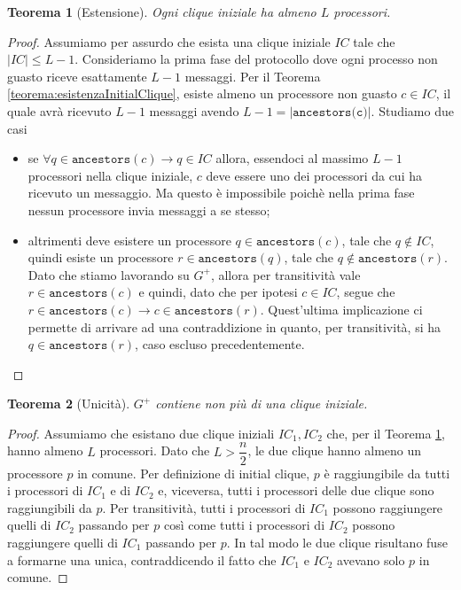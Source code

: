 \documentclass{article}
\newtheorem{teorema}{Teorema}
\begin{document}
\begin{teorema}[Estensione]
\label{teorema:estensioneInitialClique}
  Ogni clique iniziale ha almeno $L$ processori.
\end{teorema}
\begin{proof}
  Assumiamo per assurdo che esista una clique iniziale $IC$ tale che
  $|IC|\leq L-1$.  Consideriamo la prima fase del protocollo dove ogni
  processo non guasto riceve esattamente $L-1$ messaggi. Per il
  Teorema \ref{teorema:esistenzaInitialClique}, esiste almeno un
  processore non guasto $c \in IC$, il quale avrà ricevuto $L-1$
  messaggi avendo $L-1 = |\texttt{ancestors(c)}|$. Studiamo due casi
  \begin{itemize}
  \item se $\forall q \in \texttt{ancestors}(c) \rightarrow q \in IC$
    allora, essendoci al massimo $L-1$ processori nella clique
    iniziale, $c$ deve essere uno dei processori da cui ha ricevuto un
    messaggio. Ma questo è impossibile poichè nella prima fase nessun
    processore invia messaggi a se stesso;
  \item altrimenti deve esistere un processore $q \in
    \texttt{ancestors}(c)$, tale che $q \not \in IC$, quindi esiste un
    processore $r \in \texttt{ancestors} (q)$, tale che $q \not \in
    \texttt{ancestors} (r)$. Dato che stiamo lavorando su $G^+$,
    allora per transitivit\`a vale $r \in \texttt{ancestors} (c)$ e
    quindi, dato che per ipotesi $c \in IC$, segue che $r \in
    \texttt{ancestors} (c) \rightarrow c \in \texttt{ancestors}
    (r)$. Quest'ultima implicazione ci permette di arrivare ad una
    contraddizione in quanto, per transitivit\`a, si ha $q \in
    \texttt{ancestors}(r)$, caso escluso precedentemente.
  \end{itemize}
\end{proof}


\begin{teorema}[Unicità]
  \label{teorema:unicitaInitialClique}
  $G^+$ contiene non più di una clique iniziale.\end{teorema}
\begin{proof}
  Assumiamo che esistano due clique iniziali $IC_1, IC_2$ che, per il
  Teorema \ref{teorema:estensioneInitialClique}, hanno almeno $L$
  processori. Dato che $L>\dfrac{n}{2}$, le due clique hanno almeno un
  processore $p$ in comune. Per definizione di initial clique, $p$ è
  raggiungibile da tutti i processori di $IC_1$ e di $IC_2$ e,
  viceversa, tutti i processori delle due clique sono raggiungibili da
  $p$. Per transitività, tutti i processori di $IC_1$ possono
  raggiungere quelli di $IC_2$ passando per $p$ così come tutti i
  processori di $IC_2$ possono raggiungere quelli di $IC_1$ passando
  per $p$. In tal modo le due clique risultano fuse a formarne una
  unica, contraddicendo il fatto che $IC_1$ e $IC_2$ avevano solo $p$
  in comune.
\end{proof}
\end{document}
